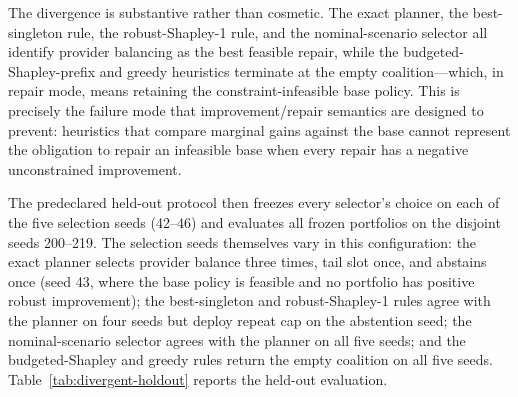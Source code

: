 \documentclass[pdflatex,sn-mathphys-num]{sn-jnl}
\theoremstyle{thmstyleone}
\theoremstyle{thmstyletwo}
\theoremstyle{thmstylethree}
\begin{document}
The divergence is substantive rather than cosmetic. The exact planner, the best-singleton rule, the robust-Shapley-1 rule, and the nominal-scenario selector all identify provider balancing as the best feasible repair, while the budgeted-Shapley-prefix and greedy heuristics terminate at the empty coalition---which, in repair mode, means retaining the constraint-infeasible base policy. This is precisely the failure mode that improvement/repair semantics are designed to prevent: heuristics that compare marginal gains against the base cannot represent the obligation to repair an infeasible base when every repair has a negative unconstrained improvement.

The predeclared held-out protocol then freezes every selector's choice on each of the five selection seeds (42--46) and evaluates all frozen portfolios on the disjoint seeds 200--219. The selection seeds themselves vary in this configuration: the exact planner selects provider balance three times, tail slot once, and abstains once (seed 43, where the base policy is feasible and no portfolio has positive robust improvement); the best-singleton and robust-Shapley-1 rules agree with the planner on four seeds but deploy repeat cap on the abstention seed; the nominal-scenario selector agrees with the planner on all five seeds; and the budgeted-Shapley and greedy rules return the empty coalition on all five seeds. Table~\ref{tab:divergent-holdout} reports the held-out evaluation.
\end{document}
